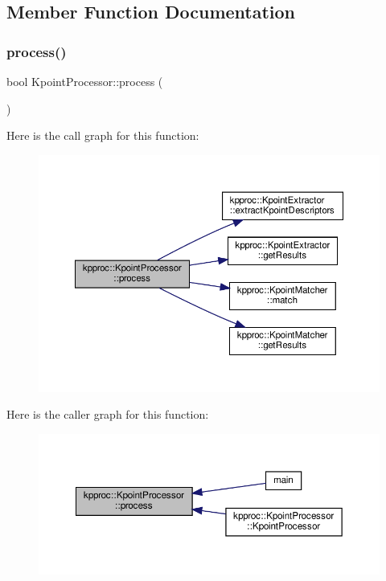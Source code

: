 \subsection{Member Function Documentation}
\mbox{\label{classkpproc_1_1KpointProcessor_a35bdf2239f6742875bbc64338488075a}} 
\subsubsection{\texorpdfstring{process()}{process()}}
{\footnotesize\ttfamily bool Kpoint\+Processor\+::process (\begin{DoxyParamCaption}{ }\end{DoxyParamCaption})}

Here is the call graph for this function\+:\nopagebreak
\begin{figure}[H]
\begin{center}
\leavevmode
\includegraphics[width=350pt]{classkpproc_1_1KpointProcessor_a35bdf2239f6742875bbc64338488075a_cgraph}
\end{center}
\end{figure}
Here is the caller graph for this function\+:\nopagebreak
\begin{figure}[H]
\begin{center}
\leavevmode
\includegraphics[width=350pt]{classkpproc_1_1KpointProcessor_a35bdf2239f6742875bbc64338488075a_icgraph}
\end{center}
\end{figure}


